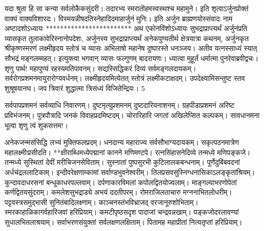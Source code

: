 यदा श्रुता हि सा कन्या सर्वलोकैकसुंदरी।
तदारभ्य स्मरातॊहमस्वस्थश्च महामुने।
इति शृत्वाऽर्जुनप्रोक्तं वाक्यं वाक्यविशारदः।
विस्मयन्नीषदतिस्नेहादिदमाहार्जुनं मुनिः।
इति अर्जुन ब्राह्मणयोस्संवादः नाम
अष्टादशोऽध्यायः
************************
अथ एकोनविंशोऽध्यायः सुभद्राप्राप्त्यर्थं अर्जुनंप्रति व्यासकृत तुलाकावेरिस्नानोपदेशः, अर्जुनस्य सुभद्राप्राप्त्यर्थं अनेकपुण्यतीर्थ क्षेत्रयात्रा कथनम्, अर्जुनकृत
श्रीकृष्णस्मरणं लक्ष्मीहृदय स्तोत्रं च
व्यासः
अभिलाषो महानेष दुष्पारस्ते धनञ्जय।
अतीव यत्नस्साध्यं स्यात् सौभद्रं मङ्गलम्महत्।
इत्युक्त्वा भगवान् व्यासः फल्गुणम् बादरायणः।
ध्यात्वा मुहूर्तं धर्मात्मा पुनरेवाब्रवीद्वचः।
शृणु पार्थ! महापुण्यं रहस्यमतिपावनम्।
सद्यस्सिद्धिकरं दिव्यं सर्वमङ्गलदायकम्।
सर्वरोगप्रशमनमायुरारोग्यवर्धनम्।
लक्ष्मीहृदयमित्येतत् स्तोत्रं लक्ष्मीकटाक्षदम्।
उपदेक्ष्यामिसन्तुष्ट स्तव शुश्रूषयानघ।
जप त्रिवारं शुद्धात्मा त्रिसंध्यं विजितेन्द्रियः।
5

सर्वपापप्रशमनं सर्वव्याधि निवारणम्।
दुष्टमृत्युप्रशमनम् दुष्टदारियनाशनम्।
ग्रहपीडाप्रशमनं अरिष्ट प्रविभंजनम्।
पुत्रपौत्रादि जनकं विवाहप्रदमिष्टदम्।
चोरारिहारि जगतां अखिलेप्सित कल्पकम्।
सावधानमना भूत्वा शृणु त्वं शुकसत्तम!।

अनेकजन्मसंसिद्धि लभ्यं मुक्तिफलप्रदम्।
धनदान्य महाराज्य सर्वसौभाग्यदायकम्।
सकृत्पठनमात्रेण महालक्ष्मीःप्रसीदति।
**क्षीराब्धिमध्येपद्मानां कानने मणिमण्टपे।
रत्नसिंहासनेदिव्ये तन्मध्ये मणिपङ्कजे।
तन्मध्ये सुस्थितां देवीं मरीचिजनसेविताम्।
सुस्नातां पुष्पसुरभी कुटिलालकबन्धनाम्।
पूर्णेदुबिंबवदनां अर्धचंद्रललाटिकाम्।
इन्दीवरेक्षणाम्कामां सर्वाण्डभुवनेश्वरीम्।
तिलप्रसवसुस्निग्धनासिकाऽलङ्कृतांश्रियम्।
कुन्दावदाधरसनां बन्धूकाधरपल्लवाम्।
दर्पणाकारविमलां कपोलद्वितयोज्वलाम्।
माङ्गल्याभरणोपेतां कर्णद्वितयसुंदराम्।
कमलेशसुभद्राड्ये अभयं ददतीपरम्।
रोमराजिलताचारु मग्ननाभितलोधरीम्।
पट्टवस्त्रसमुद्भासी सुनितंबादिलक्ष्णाम्।
काञ्चनस्तंभविभ्राजद् वरजानूरुशोभिताम्।
स्मरकाहाळिकागर्वहारिजवां हरिप्रियाम्।
कमटीपृष्ठसदृश पादाजां चन्द्रवन्नखाम्।
पङ्कजोदरलावण्यां सुधालभितलाश्रयाम्।
सर्वाभरणसंयुक्तां सर्वलक्षणलक्षिताम्।
पितामह महाप्रीतां नित्यतृप्तां हरिप्रियाम्।


